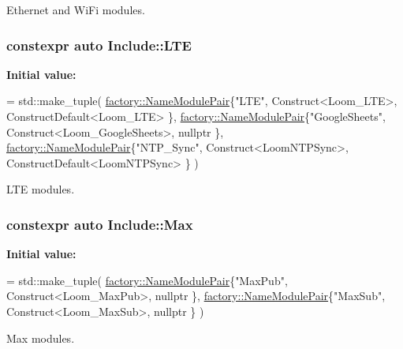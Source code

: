 Ethernet and Wi\+Fi modules. 

\subsubsection[{\texorpdfstring{L\+TE}{LTE}}]{\setlength{\rightskip}{0pt plus 5cm}constexpr auto Include\+::\+L\+TE}\hypertarget{namespace_include_a8d54cbf6e38dd18378d1fbce77da979e}{}\label{namespace_include_a8d54cbf6e38dd18378d1fbce77da979e}
{\bfseries Initial value\+:}
\begin{DoxyCode}
= std::make\_tuple(
        \hyperlink{structfactory_1_1_name_module_pair}{factory::NameModulePair}\{\textcolor{stringliteral}{"LTE"},           Construct<Loom\_LTE>,            
      ConstructDefault<Loom\_LTE> \},
        \hyperlink{structfactory_1_1_name_module_pair}{factory::NameModulePair}\{\textcolor{stringliteral}{"GoogleSheets"},  Construct<Loom\_GoogleSheets>,   \textcolor{keyword}{
      nullptr} \},
        \hyperlink{structfactory_1_1_name_module_pair}{factory::NameModulePair}\{\textcolor{stringliteral}{"NTP\_Sync"},  Construct<LoomNTPSync>,         
      ConstructDefault<LoomNTPSync> \}
    )
\end{DoxyCode}


L\+TE modules. 

\subsubsection[{\texorpdfstring{Max}{Max}}]{\setlength{\rightskip}{0pt plus 5cm}constexpr auto Include\+::\+Max}\hypertarget{namespace_include_aee5c809c679bf94fd69dc5deff6a90c4}{}\label{namespace_include_aee5c809c679bf94fd69dc5deff6a90c4}
{\bfseries Initial value\+:}
\begin{DoxyCode}
= std::make\_tuple(
                \hyperlink{structfactory_1_1_name_module_pair}{factory::NameModulePair}\{\textcolor{stringliteral}{"MaxPub"},        Construct<Loom\_MaxPub>,         \textcolor{keyword}{
      nullptr} \},
                \hyperlink{structfactory_1_1_name_module_pair}{factory::NameModulePair}\{\textcolor{stringliteral}{"MaxSub"},        Construct<Loom\_MaxSub>,         \textcolor{keyword}{
      nullptr} \}
            )
\end{DoxyCode}


Max modules. 

